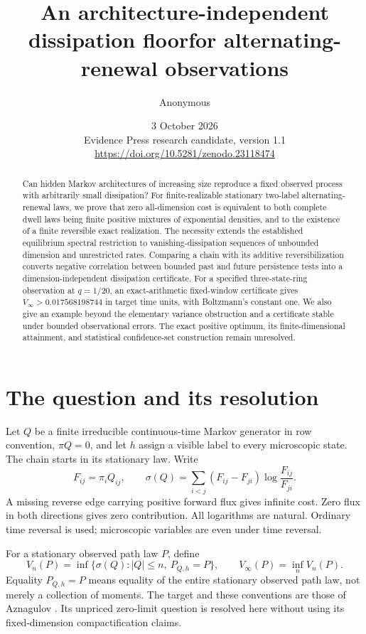\documentclass[11pt,a4paper]{article}
\title{An architecture-independent dissipation floor\newline for alternating-renewal observations}
\author{Anonymous}
\date{3 October 2026\\\small Evidence Press research candidate, version 1.1\\\small\url{https://doi.org/10.5281/zenodo.23118474}}
\newcommand{\sig}{\sigma}
\begin{document}
\maketitle
\thispagestyle{empty}
\begin{abstract}
Can hidden Markov architectures of increasing size reproduce a fixed observed process with arbitrarily small dissipation? For finite-realizable stationary two-label alternating-renewal laws, we prove that zero all-dimension cost is equivalent to both complete dwell laws being finite positive mixtures of exponential densities, and to the existence of a finite reversible exact realization. The necessity extends the established equilibrium spectral restriction to vanishing-dissipation sequences of unbounded dimension and unrestricted rates. Comparing a chain with its additive reversibilization converts negative correlation between bounded past and future persistence tests into a dimension-independent dissipation certificate. For a specified three-state-ring observation at $q=1/20$, an exact-arithmetic fixed-window certificate gives $V_\infty>0.017568198744$ in target time units, with Boltzmann's constant one. We also give an example beyond the elementary variance obstruction and a certificate stable under bounded observational errors. The exact positive optimum, its finite-dimensional attainment, and statistical confidence-set construction remain unresolved.
\end{abstract}

\section{The question and its resolution}
Let $Q$ be a finite irreducible continuous-time Markov generator in row convention, $\pi Q=0$, and let $h$ assign a visible label to every microscopic state. The chain starts in its stationary law. Write
\begin{equation}\label{eq:epr}
 F_{ij}=\pi_iQ_{ij},\qquad
 \sig(Q)=\sum_{i<j}(F_{ij}-F_{ji})\log\frac{F_{ij}}{F_{ji}}.
\end{equation}
A missing reverse edge carrying positive forward flux gives infinite cost. Zero flux in both directions gives zero contribution. All logarithms are natural. Ordinary time reversal is used; microscopic variables are even under time reversal.

For a stationary observed path law $P$, define
\begin{equation}\label{eq:V}
 V_n(P)=\inf\{\sig(Q): |Q|\leq n,\ P_{Q,h}=P\},
 \qquad V_\infty(P)=\inf_nV_n(P).
\end{equation}
Equality $P_{Q,h}=P$ means equality of the entire stationary observed path law, not merely a collection of moments. The target and these conventions are those of Aznagulov \cite{aznagulov}. Its unpriced zero-limit question is resolved here without using its fixed-dimension compactification claims.
\end{document}

